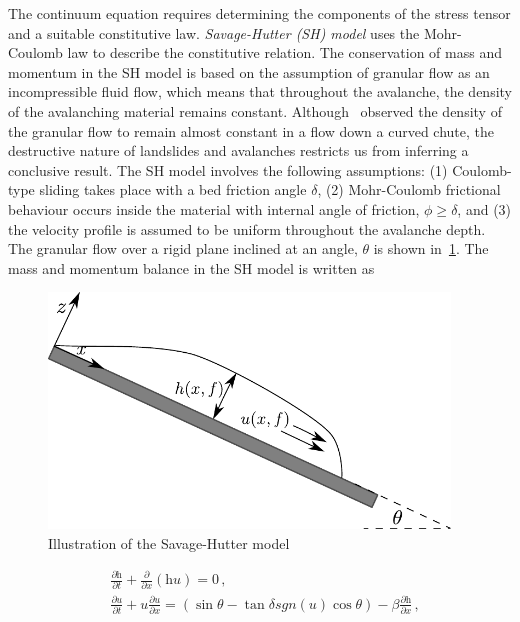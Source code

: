 The continuum equation requires determining the components of the stress tensor 
and a suitable constitutive law. \textit{Savage-Hutter (SH) model} uses the 
Mohr-Coulomb law to describe the constitutive relation. The conservation of 
mass and momentum in the SH model is based on the assumption of granular flow 
as an incompressible fluid flow, which means that throughout the avalanche, the 
density of the avalanching material remains constant. 
Although~\citet{Hutter1995} observed the density of the granular flow to remain 
almost constant in a flow down a curved chute, the destructive nature of 
landslides and avalanches restricts us from inferring a conclusive result. The 
SH model involves the following assumptions: (1) Coulomb-type sliding takes 
place with a bed friction angle $\delta$, (2) Mohr-Coulomb frictional behaviour 
occurs inside the material with internal angle of friction, $\phi \ge \delta$, 
and (3) the velocity profile is assumed to be uniform throughout the avalanche 
depth. The granular flow over a rigid plane inclined at an angle, $\theta$ is 
shown in~\cref{fig:SH}. The mass and momentum balance in the SH model is 
written as
%
\begin{figure}[htbp]
\centering
\includegraphics[width=0.95\textwidth]{SH}
\caption{Illustration of the Savage-Hutter model}
\label{fig:SH}
\end{figure}
%
\begin{align}
&\frac{\partial \textit{h}}{\partial \textit{t}} + \frac{\partial}{\partial 
\textit{x}} (\textit{hu})  =  0 \,, \\
&\frac{\partial \textit{u}}{\partial \textit{t}} + \textit{u} \frac{\partial 
\textit{u}}{\partial \textit{x}}  = (\sin \theta - \tan \delta 
\textit{sgn}(\textit{u}) \cos \theta) -\beta \frac{\partial 
\textit{h}}{\partial \textit{x}} \,,
\end{align}
